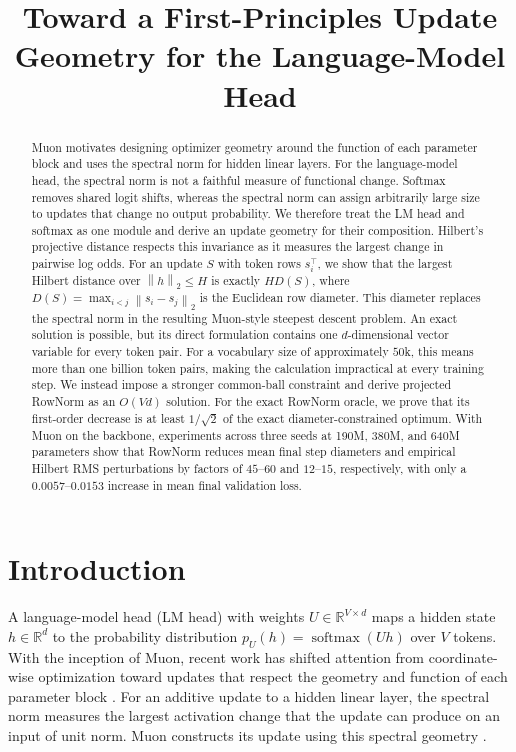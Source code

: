 \documentclass[anon]{opt2026} %
\title{Toward a First-Principles Update Geometry
for the Language-Model Head}
\newcommand{\R}{\mathbb{R}}
\newcommand{\norm}[1]{\left\lVert #1\right\rVert}
\DeclareMathOperator{\softmax}{softmax}
\begin{document}
\maketitle


\begin{abstract}
Muon motivates designing optimizer geometry around the function of each parameter block and uses the spectral norm for hidden linear layers.
For the language-model head, the spectral norm is not a faithful measure of functional change.
Softmax removes shared logit shifts, whereas the spectral norm can assign arbitrarily large size to updates that change no output probability.
We therefore treat the LM head and softmax as one module and derive an update geometry for their composition.
Hilbert's projective distance respects this invariance as it measures the largest change in pairwise log odds.
For an update $S$ with token rows $s_i^\top$, we show that the largest Hilbert distance over $\norm{h}_2\leq H$ is exactly $H D(S)$, where $D(S)=\max_{i<j}\norm{s_i-s_j}_2$ is the Euclidean row diameter. This diameter replaces the spectral norm in the resulting Muon-style steepest descent problem.
An exact solution is possible, but its direct formulation contains one $d$-dimensional vector variable for every token pair. For a vocabulary size of approximately $50$k, this means more than one billion token pairs, making the calculation impractical at every training step. We instead impose a stronger common-ball constraint and derive projected RowNorm as an $O(Vd)$ solution.
For the exact RowNorm oracle, we prove that its first-order decrease is at least $1/\sqrt{2}$ of the exact diameter-constrained optimum.
With Muon on the backbone, experiments across three seeds at 190M, 380M, and 640M parameters show that RowNorm reduces mean final step diameters and empirical Hilbert RMS perturbations by factors of $45$--$60$ and $12$--$15$, respectively, with only a
$0.0057$--$0.0153$ increase in mean final validation loss.
\end{abstract}


\section{Introduction}

A language-model head (LM head) with weights $U\in\R^{V\times d}$ maps a hidden state $h\in\R^d$ to the probability distribution $p_U(h)=\softmax(Uh)$ over $V$ tokens. With the inception of Muon, recent work has shifted attention from coordinate-wise optimization toward updates that respect the geometry and function of each parameter block \citep{bernstein2024old, bernstein2024modular, large2024scalable}.
For an additive update to a hidden linear layer, the spectral norm measures the largest activation change that the update can produce on an input of unit norm.
Muon constructs its update using this spectral geometry \citep{liu2025muon, jordan2024muon, pethick2025trainingdeeplearningmodels}.
\end{document}
